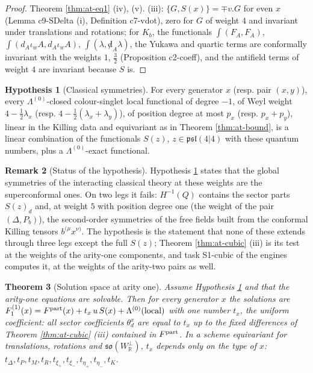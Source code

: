 \documentclass[11pt]{article}
\numberwithin{equation}{section}
\theoremstyle{plain}
\newtheorem{theorem}{Theorem}[section]
\theoremstyle{definition}
\newtheorem{remark}[theorem]{Remark}
\newtheorem{hypothesis}[theorem]{Hypothesis}
\newcommand{\dslash}{{\not d}}
\begin{document}
\begin{proof}
Theorem \ref{thm:at-eq1} (iv), (v). (iii): $\{G,S(x)\}=\mp v.G$ for even $x$ (Lemma c9-SDelta (i), Definition c7-vdot), zero for $G$ of weight $4$ and invariant under translations and rotations; for $K_b$, the functionals $\int(F_A,F_A)$, $\int(d_A\iota_wA,d_A\iota_wA)$, $\int(\lambda,\dslash_A\lambda)$, the Yukawa and quartic terms are conformally invariant with the weights $1$, $\tfrac32$ (Proposition c2-coeff), and the antifield terms of weight $4$ are invariant because $S$ is.
\end{proof}

\begin{hypothesis}[Classical symmetries]
\label{hyp:at-H}
For every generator $x$ (resp. pair $(x,y)$), every $\Lambda^{(0)}$-closed colour-singlet local functional of degree $-1$, of Weyl weight $4-\tfrac12\lambda_x$ (resp. $4-\tfrac12(\lambda_x+\lambda_y)$), of position degree at most $p_x$ (resp. $p_x+p_y$), linear in the Killing data and equivariant as in Theorem \ref{thm:at-bound}, is a linear combination of the functionals $S(z)$, $z\in\mathfrak{psl}(4|4)$ with these quantum numbers, plus a $\Lambda^{(0)}$-exact functional.
\end{hypothesis}

\begin{remark}[Status of the hypothesis]
\label{rem:at-H}
Hypothesis \ref{hyp:at-H} states that the global symmetries of the interacting classical theory at these weights are the superconformal ones. On two legs it fails: $H^{-1}(Q)$ contains the sector parts $S(z)_d$ and, at weight $5$ with position degree one (the weight of the pair $(\Delta,P_b)$), the second-order symmetries of the free fields built from the conformal Killing tensors $b^{(\mu}x^{\nu)}$. The hypothesis is the statement that none of these extends through three legs except the full $S(z)$; Theorem \ref{thm:at-cubic} (iii) is its test at the weights of the arity-one components, and task S1-cubic of the engines computes it, at the weights of the arity-two pairs as well.
\end{remark}

\begin{theorem}[Solution space at arity one]
\label{thm:at-H}
Assume Hypothesis \ref{hyp:at-H} and that the arity-one equations are solvable. Then for every generator $x$ the solutions are $F_1^{(1)}(x)=F^{\rm part}(x)+t_x\,u\,S(x)+\Lambda^{(0)}(\text{local})$ with one number $t_x$, the uniform coefficient: all sector coefficients $\theta^x_d$ are equal to $t_x$ up to the fixed differences of Theorem \ref{thm:at-cubic} (iii) contained in $F^{\rm part}$. In a scheme equivariant for translations, rotations and $\mathfrak{so}(W^\perp_{\mathbb R})$, $t_x$ depends only on the type of $x$: $t_\Delta,t_P,t_M,t_R,t_{\xi_+},t_{\xi_-},t_{\eta_+},t_{\eta_-},t_K$.
\end{theorem}
\end{document}

